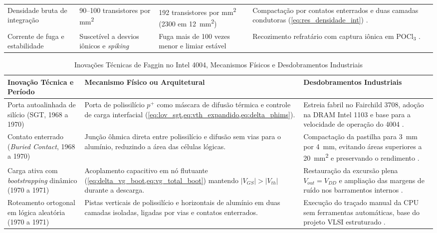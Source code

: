 \begin{table}[!t]
\begin{tabularx}{\textwidth}{>{\raggedright\arraybackslash}p{3.4cm} >{\raggedright\arraybackslash}p{3.8cm} >{\raggedright\arraybackslash}p{4.1cm} >{\raggedright\arraybackslash}X}
Densidade bruta de integração & \numrange{90}{100} transistores por \si{\milli\meter\squared} & \num{192} transistores por \si{\milli\meter\squared} (\num{2300} em \SI{12}{\milli\meter\squared}) & Compactação por contatos enterrados e duas camadas condutoras (\cref{eq:res_densidade_int}) \cite{faggin2018howwemade}. \\
Corrente de fuga e estabilidade & Suscetível a desvios iônicos e \textit{spiking} & Fuga mais de 100 vezes menor e limiar estável & Recozimento refratário com captura iônica em $\text{POCl}_3$ \cite{faggin1970}. \\
\bottomrule
\end{tabularx}
\end{table}

\begin{table}[!t]
\renewcommand{\arraystretch}{1.2}
\caption{Inovações Técnicas de Faggin no Intel 4004, Mecanismos Físicos e Desdobramentos Industriais}
\label{tab:inovacoes_faggin}
\centering
\begin{tabularx}{\textwidth}{>{\raggedright\arraybackslash}p{4.0cm} >{\raggedright\arraybackslash}p{5.5cm} >{\raggedright\arraybackslash}X}
\toprule
\textbf{Inovação Técnica e Período} & \textbf{Mecanismo Físico ou Arquitetural} & \textbf{Desdobramentos Industriais} \\
\midrule
Porta autoalinhada de silício (SGT, 1968 a 1970) & Porta de polissilício $p^+$ como máscara de difusão térmica e controle de carga interfacial (\cref{eq:lov_sgt,eq:vth_expandido,eq:delta_phims}). & Estreia fabril no Fairchild 3708, adoção na DRAM Intel 1103 e base para a velocidade de operação do 4004 \cite{faggin1970}. \\
Contato enterrado (\textit{Buried Contact}, 1968 a 1970) & Junção ôhmica direta entre polissilício e difusão sem vias para o alumínio, reduzindo a área das células lógicas. & Compactação da pastilha para \SI{3}{\milli\meter} por \SI{4}{\milli\meter}, evitando áreas superiores a \SI{20}{\milli\meter\squared} e preservando o rendimento \cite{vadasz1972patent, faggin2021}. \\
Carga ativa com \textit{bootstrapping} dinâmico (1970 a 1971) & Acoplamento capacitivo em nó flutuante (\cref{eq:delta_vg_boot,eq:vg_total_boot}) mantendo $|V_{GS}| > |V_{th}|$ durante a descarga. & Restauração da excursão plena $V_{out} = V_{DD}$ e ampliação das margens de ruído nos barramentos internos \cite{faggin1996}. \\
Roteamento ortogonal em lógica aleatória (1970 a 1971) & Pistas verticais de polissilício e horizontais de alumínio em duas camadas isoladas, ligadas por vias e contatos enterrados. & Execução do traçado manual da CPU sem ferramentas automáticas, base do projeto VLSI estruturado \cite{mead1980, faggin2021}. \\

\end{tabularx}
\end{table}
